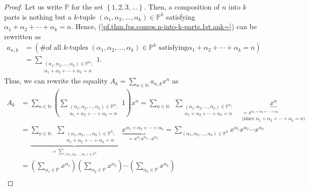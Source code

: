 \begin{proof}
Let us write $\mathbb{P}$ for the set $\left\{  1,2,3,\ldots\right\}  $. Then,
a composition of $n$ into $k$ parts is nothing but a $k$-tuple $\left(
\alpha_{1},\alpha_{2},\ldots,\alpha_{k}\right)  \in\mathbb{P}^{k}$ satisfying
$\alpha_{1}+\alpha_{2}+\cdots+\alpha_{k}=n$. Hence,
(\ref{pf.thm.fps.comps.n-into-k-parts.1st.ank=}) can be rewritten as%
\begin{align}
a_{n,k}  &  =\left(  \text{\# of all }k\text{-tuples }\left(  \alpha
_{1},\alpha_{2},\ldots,\alpha_{k}\right)  \in\mathbb{P}^{k}\text{ satisfying
}\alpha_{1}+\alpha_{2}+\cdots+\alpha_{k}=n\right) \nonumber\\
&  =\sum\limits_{\substack{\left(  \alpha_{1},\alpha_{2},\ldots,\alpha
_{k}\right)  \in\mathbb{P}^{k};\\\alpha_{1}+\alpha_{2}+\cdots+\alpha_{k}=n}}1.
\label{pf.thm.fps.comps.n-into-k-parts.1st.ank=2}%
\end{align}
Thus, we can rewrite the equality $A_{k}=\sum_{n\in\mathbb{N}}a_{n,k}x^{n}$
as
\begin{align*}
A_{k}  &  =\sum_{n\in\mathbb{N}}\left(  \sum\limits_{\substack{\left(
\alpha_{1},\alpha_{2},\ldots,\alpha_{k}\right)  \in\mathbb{P}^{k};\\\alpha
_{1}+\alpha_{2}+\cdots+\alpha_{k}=n}}1\right)  x^{n}=\sum_{n\in\mathbb{N}%
}\ \ \sum\limits_{\substack{\left(  \alpha_{1},\alpha_{2},\ldots,\alpha
_{k}\right)  \in\mathbb{P}^{k};\\\alpha_{1}+\alpha_{2}+\cdots+\alpha_{k}%
=n}}\ \ \underbrace{x^{n}}_{\substack{=x^{\alpha_{1}+\alpha_{2}+\cdots
+\alpha_{k}}\\\text{(since }\alpha_{1}+\alpha_{2}+\cdots+\alpha_{k}=n\text{)}%
}}\\
&  =\underbrace{\sum_{n\in\mathbb{N}}\ \ \sum\limits_{\substack{\left(
\alpha_{1},\alpha_{2},\ldots,\alpha_{k}\right)  \in\mathbb{P}^{k};\\\alpha
_{1}+\alpha_{2}+\cdots+\alpha_{k}=n}}}_{=\sum\limits_{\left(  \alpha
_{1},\alpha_{2},\ldots,\alpha_{k}\right)  \in\mathbb{P}^{k}}}%
\ \ \underbrace{x^{\alpha_{1}+\alpha_{2}+\cdots+\alpha_{k}}}_{=x^{\alpha_{1}%
}x^{\alpha_{2}}\cdots x^{\alpha_{k}}}=\sum\limits_{\left(  \alpha_{1}%
,\alpha_{2},\ldots,\alpha_{k}\right)  \in\mathbb{P}^{k}}x^{\alpha_{1}%
}x^{\alpha_{2}}\cdots x^{\alpha_{k}}\\
&  =\left(  \sum_{\alpha_{1}\in\mathbb{P}}x^{\alpha_{1}}\right)  \left(
\sum_{\alpha_{2}\in\mathbb{P}}x^{\alpha_{2}}\right)  \cdots\left(
\sum_{\alpha_{k}\in\mathbb{P}}x^{\alpha_{k}}\right) \\

\end{align*}
\end{proof}

